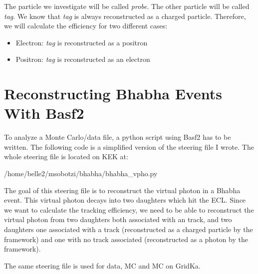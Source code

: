 \documentclass[a4paper,11pt,twosided,final,german,openbib,pdftex,listof=totoc,bibliography=totoc]{scrbook}
\begin{document}
The particle we investigate will be called \textit{probe}. The other particle will be called \textit{tag}. We  know that \textit{tag} is always reconstructed as a charged particle. Therefore, we will calculate the efficiency for two different cases:

\begin{itemize}
	
	\item Electron: \textit{tag} is reconstructed as a positron
	\item Positron: \textit{tag} is reconstructed as an electron
\end{itemize}





\section{Reconstructing Bhabha Events With Basf2}
\label{sec:RecBasf2}


To analyze a Monte Carlo/data file, a python script using Basf2 has to be written. The following code is a simplified version of the steering file I wrote. 
The whole steering file is located on KEK at:
\newline 

/home/belle2/msobotzi/bhabha/bhabha\_vpho.py
\newline


The goal of this steering file is to reconstruct the virtual photon in a Bhabha event. This virtual photon decays into two daughters which hit the ECL. Since we want to calculate the tracking efficiency, we need to be able to reconstruct the virtual photon from two daughters both associated with an track, and two daughters one associated with a track (reconstructed as a charged particle by the framework) and one with no track associated (reconstructed as a photon by the framework).

The same steering file is used for data, MC and MC on GridKa. 
\newline 
\end{document}
